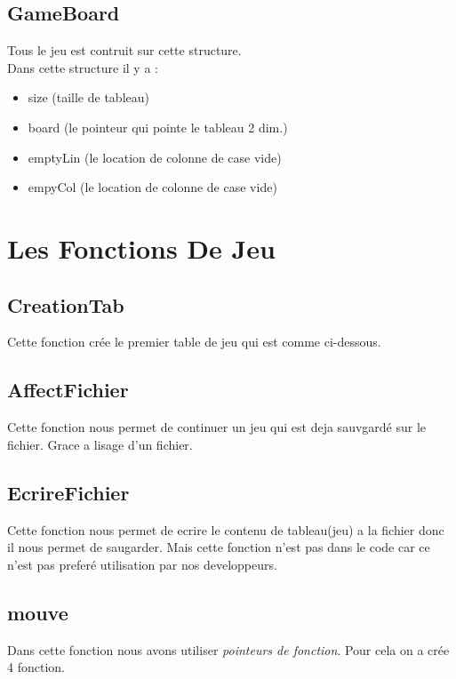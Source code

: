\documentclass{article}
\begin{document}
\subsection{GameBoard}
Tous le jeu est contruit sur cette structure.
\\
Dans cette structure il y a : \\

\begin{itemize}
	\item size (taille de tableau)
	\item board (le pointeur qui pointe le tableau 2 dim.)
	\item emptyLin (le location de colonne de case vide)
	\item empyCol (le location de colonne de case vide)
\end{itemize}


\section{Les Fonctions De Jeu}

\subsection{CreationTab}
Cette fonction crée le premier table de jeu qui est comme ci-dessous.


\subsection{AffectFichier}
Cette fonction nous permet de continuer un jeu qui est deja sauvgardé sur le fichier. Grace a lisage d'un fichier.

\subsection{EcrireFichier}
Cette fonction nous permet de ecrire le contenu de tableau(jeu) a la fichier donc il nous permet de saugarder.
Mais cette fonction n'est pas dans le code car ce n'est pas preferé utilisation par nos developpeurs.

\subsection{mouve}
Dans cette fonction nous avons utiliser \textit{pointeurs de fonction}. Pour cela on a crée 4 fonction.	
\end{document}
